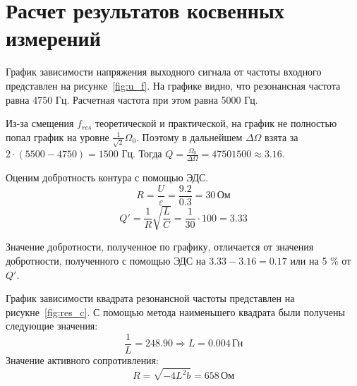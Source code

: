 \section{Расчет результатов косвенных измерений}
График зависимости напряжения выходного сигнала от частоты входного
представлен на рисунке~\ref{fig:u_f}.
На графике видно, что резонансная частота равна 4750 Гц.
Расчетная частота при этом равна 5000 Гц.

Из-за смещения $f_{res}$ теоретической и практической, на график не полностью
попал график на уровне $\frac{1}{\sqrt{2}} \Omega_0$.
Поэтому в дальнейшем $\Delta \Omega$ взята за $2 \cdot (5500 - 4750) = 1500$ Гц.
Тогда $Q = \frac{\Omega_0}{\Delta \Omega} = {4750}{1500} \approx 3.16$.

Оценим добротность контура с помощью ЭДС.
\[
	R = \frac{U}{\varepsilon} = \frac{9.2}{0.3} = 30 \, \text{Ом}
\]
\[
	Q' = \frac{1}{R} \sqrt{\frac{L}{C}} = \frac{1}{30} \cdot 100 = 3.33
\]

Значение добротности, полученное по графику, отличается от значения добротности,
полученного с помощью ЭДС на \(3.33 - 3.16 = 0.17\) или на 5 \% от \(Q'\).

График зависимости квадрата резонансной частоты представлен на рисукне~\ref{fig:res_c}.
С помощью метода наименьшего квадрата были получены следующие значения:
\[
	\frac{1}{L} = 248.90 \Rightarrow L = 0.004 \, \text{Гн}
\]
Значение активного сопротивления:
\[
	R = \sqrt{- 4 L^2 b} = 658 \, \text{Ом}
\]
